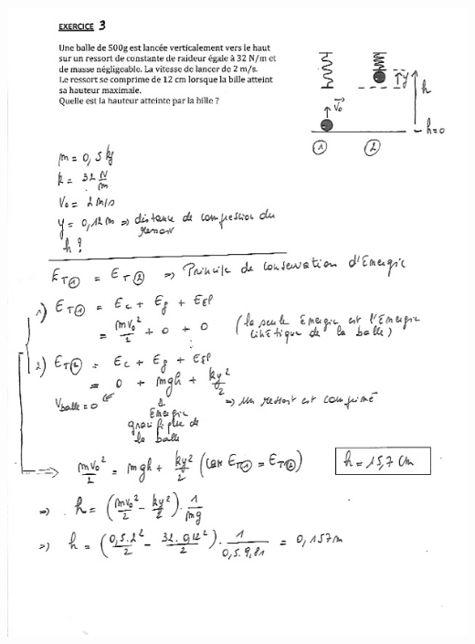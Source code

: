  \includegraphics[width=15cm]{COURS2EnergieOHEXERCRESOL-img/COURS2EnergieOHEXERCRESOL-img011.png} 

